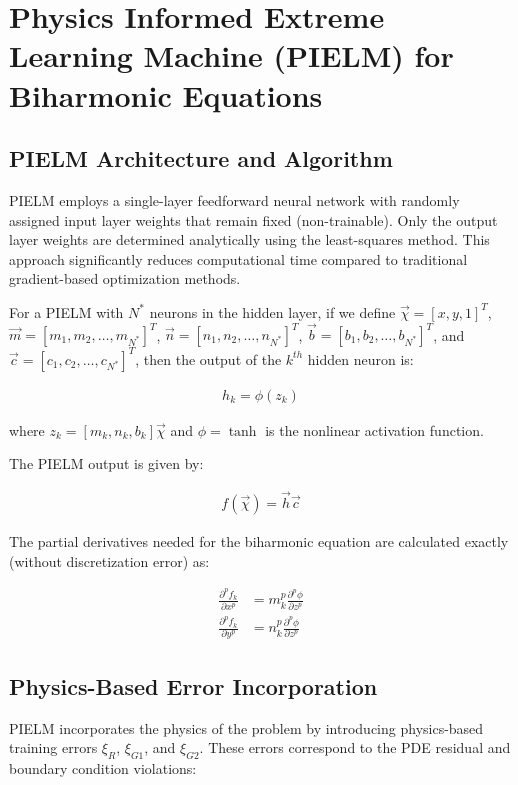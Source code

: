\documentclass[11pt]{article}
\begin{document}
\section{Physics Informed Extreme Learning Machine (PIELM) for Biharmonic Equations}

\subsection{PIELM Architecture and Algorithm}

PIELM employs a single-layer feedforward neural network with randomly assigned input layer weights that remain fixed (non-trainable). Only the output layer weights are determined analytically using the least-squares method. This approach significantly reduces computational time compared to traditional gradient-based optimization methods.

For a PIELM with $N^*$ neurons in the hidden layer, if we define $\vec{\chi} = [x, y, 1]^T$, $\vec{m} = [m_1, m_2, \ldots, m_{N^*}]^T$, $\vec{n} = [n_1, n_2, \ldots, n_{N^*}]^T$, $\vec{b} = [b_1, b_2, \ldots, b_{N^*}]^T$, and $\vec{c} = [c_1, c_2, \ldots, c_{N^*}]^T$, then the output of the $k^{th}$ hidden neuron is:

\begin{align}
h_k = \phi(z_k)
\end{align}

where $z_k = [m_k, n_k, b_k]\vec{\chi}$ and $\phi = \tanh$ is the nonlinear activation function.

The PIELM output is given by:

\begin{align}
f(\vec{\chi}) = \vec{h}\vec{c}
\end{align}

The partial derivatives needed for the biharmonic equation are calculated exactly (without discretization error) as:

\begin{align}
\frac{\partial^p f_k}{\partial x^p} &= m_k^p \frac{\partial^p \phi}{\partial z^p}\\
\frac{\partial^p f_k}{\partial y^p} &= n_k^p \frac{\partial^p \phi}{\partial z^p}
\end{align}

\subsection{Physics-Based Error Incorporation}

PIELM incorporates the physics of the problem by introducing physics-based training errors $\xi_R$, $\xi_{G1}$, and $\xi_{G2}$. These errors correspond to the PDE residual and boundary condition violations:
\end{document}
